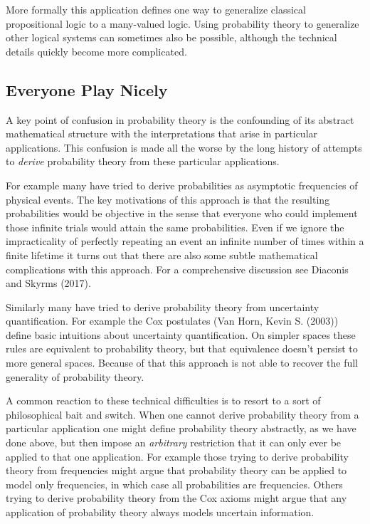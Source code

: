 \documentclass[
  letterpaper,
  DIV=11,
  numbers=noendperiod]{scrartcl}
\begin{document}
More formally this application defines one way to generalize classical
propositional logic to a many-valued logic. Using probability theory to
generalize other logical systems can sometimes also be possible,
although the technical details quickly become more complicated.

\hypertarget{everyone-play-nicely}{%
\subsection{Everyone Play Nicely}\label{everyone-play-nicely}}

A key point of confusion in probability theory is the confounding of its
abstract mathematical structure with the interpretations that arise in
particular applications. This confusion is made all the worse by the
long history of attempts to \emph{derive} probability theory from these
particular applications.

For example many have tried to derive probabilities as asymptotic
frequencies of physical events. The key motivations of this approach is
that the resulting probabilities would be objective in the sense that
everyone who could implement those infinite trials would attain the same
probabilities. Even if we ignore the impracticality of perfectly
repeating an event an infinite number of times within a finite lifetime
it turns out that there are also some subtle mathematical complications
with this approach. For a comprehensive discussion see Diaconis and
Skyrms (2017).

Similarly many have tried to derive probability theory from uncertainty
quantification. For example the Cox postulates (Van Horn, Kevin S.
(2003)) define basic intuitions about uncertainty quantification. On
simpler spaces these rules are equivalent to probability theory, but
that equivalence doesn't persist to more general spaces. Because of that
this approach is not able to recover the full generality of probability
theory.

A common reaction to these technical difficulties is to resort to a sort
of philosophical bait and switch. When one cannot derive probability
theory from a particular application one might define probability theory
abstractly, as we have done above, but then impose an \emph{arbitrary}
restriction that it can only ever be applied to that one application.
For example those trying to derive probability theory from frequencies
might argue that probability theory can be applied to model only
frequencies, in which case all probabilities are frequencies. Others
trying to derive probability theory from the Cox axioms might argue that
any application of probability theory always models uncertain
information.
\end{document}
